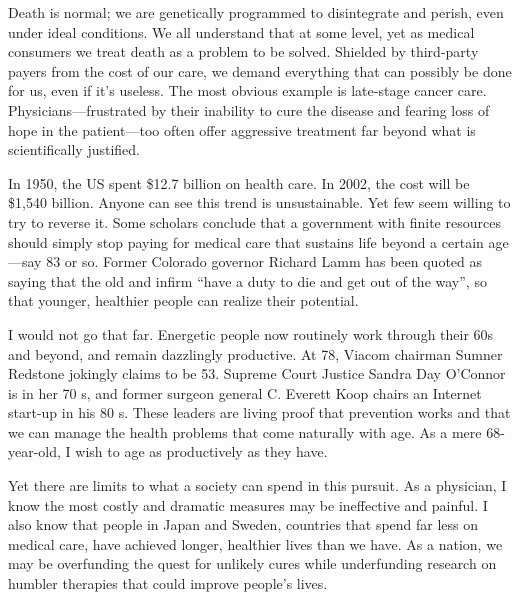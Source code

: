 Death is normal; we are genetically programmed to disintegrate and
perish, even under ideal conditions. We all understand that at some
level, yet as medical consumers we treat death as a problem to be
solved. Shielded by third-party payers from the cost of our care, we
demand everything that can possibly be done for us, even if it's
useless. The most obvious example is late-stage cancer care.
Physicians---frustrated by their inability to cure the disease and
fearing loss of hope in the patient---too often offer aggressive
treatment far beyond what is scientifically justified.

In 1950, the US spent \$12.7 billion on health care. In 2002, the cost
will be \$1,540 billion. Anyone can see this trend is unsustainable. Yet
few seem willing to try to reverse it. Some scholars conclude that a
government with finite resources should simply stop paying for medical
care that sustains life beyond a certain age---say 83 or so. Former
Colorado governor Richard Lamm has been quoted as saying that the old
and infirm ``have a duty to die and get out of the way'', so that
younger, healthier people can realize their potential.

I would not go that far. Energetic people now routinely work through
their 60s and beyond, and remain dazzlingly productive. At 78, Viacom
chairman Sumner Redstone jokingly claims to be 53. Supreme Court Justice
Sandra Day O'Connor is in her 70 s, and former surgeon general
C. Everett
Koop chairs an Internet start-up in his 80 s. These leaders are living
proof that prevention works and that we can manage the health problems
that come naturally with age. As a mere 68-year-old, I wish to age as
productively as they have.

Yet there are limits to what a society can spend in this pursuit. As a
physician, I know the most costly and dramatic measures may be
ineffective and painful. I also know that people in Japan and Sweden,
countries that spend far less on medical care, have achieved longer,
healthier lives than we have. As a nation, we may be overfunding the
quest for unlikely cures while underfunding research on humbler
therapies that could improve people's lives.


